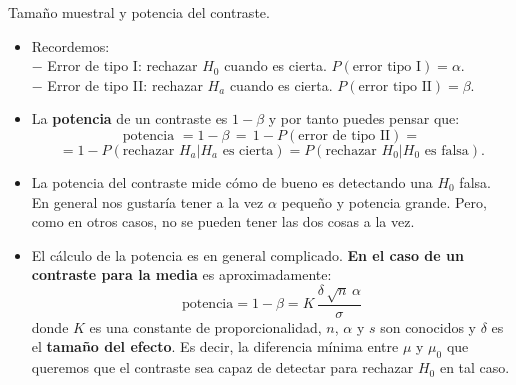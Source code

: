 \documentclass[
  9pt,
  ignorenonframetext,
]{beamer}
\begin{document}
\begin{frame}{Tamaño muestral y potencia del contraste.}
\protect\hypertarget{tamano-muestral-y-potencia-del-contraste.}{}

\begin{itemize}
\item
  Recordemos:\\
  \(-\) Error de tipo I: rechazar \(H_0\) cuando es cierta.
  \(P(\text{error tipo I}) = \alpha\).\\
  \(-\) Error de tipo II: rechazar \(H_a\) cuando es cierta.
  \(P(\text{error tipo II}) = \beta\).
\item
  La \textbf{potencia} de un contraste es \(1 -\beta\) y por tanto
  puedes pensar que:\small
  \[\mbox{potencia } =  1-\beta\, = \,1-P(\mbox{error de tipo II})  = \]
  \[
  = 1 - P(\mbox{rechazar }H_a | H_a\mbox{ es cierta}) = P(\mbox{rechazar }H_0 | H_0\mbox{ es falsa}).
  \] \normalsize
\item
  La potencia del contraste mide cómo de bueno es detectando una \(H_0\)
  falsa. En general nos gustaría tener a la vez \(\alpha\) pequeño y
  potencia grande. Pero, como en otros casos, no se pueden tener las dos
  cosas a la vez.
\item
  El cálculo de la potencia es en general complicado. \textbf{En el caso
  de un contraste para la media} es aproximadamente: \[
  \text{potencia} = 1 - \beta = K\, \dfrac{\delta\,\sqrt{n}\,\alpha}{\sigma}
  \] donde \(K\) es una constante de proporcionalidad, \(n\), \(\alpha\)
  y \(s\) son conocidos y \(\delta\) es el \textbf{tamaño del efecto}.
  Es decir, la diferencia mínima entre \(\mu\) y \(\mu_0\) que queremos
  que el contraste sea capaz de detectar para rechazar \(H_0\) en tal
  caso.
\end{itemize}

\end{frame}
\end{document}
